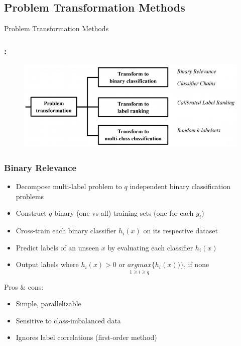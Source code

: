\documentclass{beamer}
\begin{document}
\subsection{Problem Transformation Methods}
\begin{frame}
\Huge{\centerline{Problem Transformation Methods}}
\end{frame}
\begin{frame}
\frametitle{\insertsection : \insertsubsection}
\begin{figure}
	\begin{center}
		\includegraphics[scale = 0.7]{images/pt.png}
	\end{center}
\end{figure}
\end{frame}
\begin{frame}
\frametitle{Binary Relevance}

\begin{itemize}
	\item Decompose multi-label problem to $q$ independent binary classification problems
	\item Construct $q$ binary (one-vs-all) training sets (one for each $y_i$)
	\item Cross-train each binary classifier $h_i(x)$ on its respective dataset
	
	\item Predict labels of an unseen $x$ by evaluating each classifier $h_i(x)$
	\item Output labels where  $h_i(x) > 0$ or $\underset{1 \geq i \geq q}{argmax} \{h_i(x))\}$, if none
\end{itemize}

Pros \& cons:
\begin{itemize}
	\item Simple, parallelizable
	\item Sensitive to class-imbalanced data
	\item Ignores label correlations (first-order method)
\end{itemize}

\end{frame}
\end{document}
